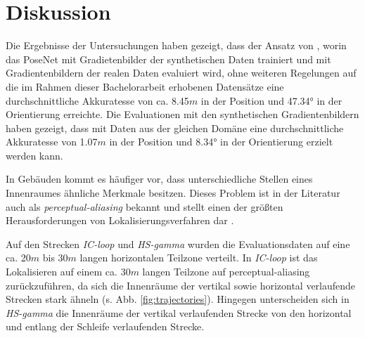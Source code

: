 
\section{Diskussion}
\label{sec:kapitel_5}

Die Ergebnisse der Untersuchungen haben gezeigt, dass der Ansatz von \citet{acharyaBIMPoseNetIndoorCamera2019}, worin das PoseNet mit Gradietenbilder der synthetischen Daten trainiert und mit Gradientenbildern der realen Daten evaluiert wird, ohne weiteren Regelungen auf die im Rahmen dieser Bachelorarbeit erhobenen Datensätze eine durchschnittliche Akkuratesse von ca. 8.45$m$ in der Position und 47.34° in der Orientierung erreichte. Die Evaluationen mit den synthetischen Gradientenbildern haben gezeigt, dass mit Daten aus der gleichen Domäne eine durchschnittliche Akkuratesse von 1.07$m$ in der Position und 8.34° in der Orientierung erzielt werden kann. 


In Gebäuden kommt es häufiger vor, dass unterschiedliche Stellen eines Innenraumes ähnliche Merkmale besitzen. Dieses Problem ist in der Literatur auch als \textit{perceptual-aliasing} bekannt und stellt einen der größten Herausforderungen von Lokalisierungsverfahren dar \cite{lowryVisualPlaceRecognition2016}.

Auf den Strecken \textit{IC-loop} und \textit{HS-gamma} wurden die Evaluationsdaten auf eine ca. 20$m$ bis 30$m$ langen horizontalen Teilzone verteilt. In \textit{IC-loop} ist das Lokalisieren auf einem ca. 30$m$ langen Teilzone auf perceptual-aliasing zurückzuführen, da sich die Innenräume der vertikal sowie horizontal verlaufende Strecken stark ähneln (s. Abb. \ref{fig:trajectories}). Hingegen unterscheiden sich in \textit{HS-gamma} die Innenräume der vertikal verlaufenden Strecke von den horizontal und entlang der Schleife verlaufenden Strecke.


%



% 





